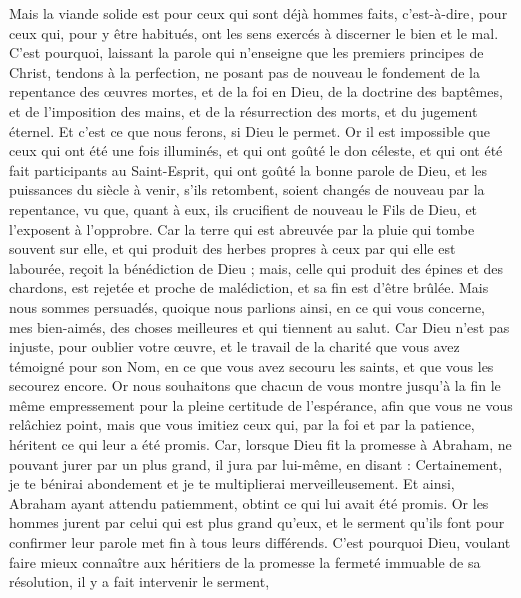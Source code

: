 \begin{multicols}{2}
Mais la viande solide est pour ceux qui sont déjà hommes faits, {c'est-à-dire }, pour ceux qui, pour y être habitués, ont les sens exercés à discerner le bien et le mal.
\VerseOne{}C'est pourquoi, laissant la parole qui n'enseigne que les premiers principes de Christ, tendons à la perfection, ne posant pas de nouveau le fondement de la repentance des œuvres mortes, et de la foi en Dieu,
de la doctrine des baptêmes, et de l'imposition des mains, et de la résurrection des morts, et du jugement éternel.
Et c'est ce que nous ferons, si Dieu le permet.
Or il est impossible que ceux qui ont été une fois illuminés, et qui ont goûté le don céleste, et qui ont été fait participants au Saint-Esprit,
qui ont goûté la bonne parole de Dieu, et les puissances du siècle à venir,
s'ils retombent, soient changés de nouveau par la repentance, vu que, quant à eux, ils crucifient de nouveau le Fils de Dieu, et l'exposent à l'opprobre.
Car la terre qui est abreuvée par la pluie qui tombe souvent sur elle, et qui produit des herbes propres à ceux par qui elle est labourée, reçoit la bénédiction de Dieu ;
mais, celle qui produit des épines et des chardons, est rejetée et proche de malédiction, et sa fin est d'être brûlée.
Mais nous sommes persuadés, quoique nous parlions ainsi, en ce qui vous concerne, mes bien-aimés, des choses meilleures et qui tiennent au salut.
Car Dieu n'est pas injuste, pour oublier votre œuvre, et le travail de la charité que vous avez témoigné pour son Nom, en ce que vous avez secouru les saints, et que vous les secourez encore.
Or nous souhaitons que chacun de vous montre jusqu'à la fin le même empressement pour la pleine certitude de l'espérance,
afin que vous ne vous relâchiez point, mais que vous imitiez ceux qui, par la foi et par la patience, héritent ce qui leur a été promis.
Car, lorsque Dieu fit la promesse à Abraham, ne pouvant jurer par un plus grand, il jura par lui-même,
en disant : Certainement, je te bénirai abondement et je te multiplierai merveilleusement.
Et ainsi, Abraham ayant attendu patiemment, obtint ce qui lui avait été promis.
Or les hommes jurent par celui qui est plus grand qu'eux, et le serment qu'ils font pour confirmer leur parole met fin à tous leurs différends.
C'est pourquoi Dieu, voulant faire mieux connaître aux héritiers de la promesse la fermeté immuable de sa résolution, il y a fait intervenir le serment,

\end{multicols}
